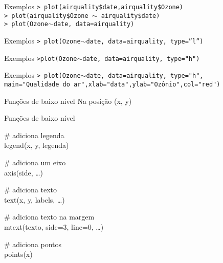 \documentclass{beamer}
\begin{document}
\begin{frame}{Exemplos}
\texttt{> plot(airquality\$date,airquality\$Ozone)\\
> plot(airquality\$Ozone $\sim$ airquality\$date)\\
> plot(Ozone$\sim$date, data=airquality)}

\centering
{}
\end{frame}

\begin{frame}{Exemplos}
\texttt{> plot(Ozone$\sim$date, data=airquality, type=''l'')}
\centering
{}
  
\end{frame}

\begin{frame}{Exemplos}
  \texttt{>plot(Ozone$\sim$date, data=airquality, type="h")}

  \begin{center}
     
  \end{center}

\end{frame}

\begin{frame}{Exemplos}
  \texttt{> plot(Ozone$\sim$date, data=airquality, type="h", main="Qualidade do ar",xlab="data",ylab="Ozônio",col="red")}
  \begin{center}
     
  \end{center}
\end{frame}

\begin{frame}{Funções de baixo nível}
Na posição (x, y)\\
  \begin{block}{Funções de baixo nível}

\# adiciona legenda \\
legend(x, y, legenda)\\  \vspace{10pt}

\# adiciona um eixo\\
axis(side, \ldots)\\  \vspace{10pt}

\# adiciona texto \\
text(x, y, labels, \ldots)\\  \vspace{10pt}

\# adiciona texto na margem \\
mtext(texto, side=3, line=0, \ldots)\\  \vspace{10pt}

\# adiciona pontos\\ 
points(x)\\
 \end{block}
  
\end{frame}
\end{document}
